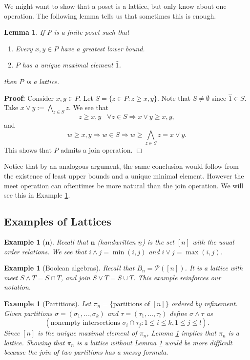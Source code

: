 \documentclass[11pt]{article}
\newtheorem{lemma}[theorem]{Lemma}
\newtheorem{example}[theorem]{Example}
\newenvironment{proof}{\noindent \textbf{Proof:}}{$\Box$}
\newcommand{\Bf}[1]{\textbf{#1}}
\newcommand{\wed}{\wedge}
\begin{document}
We might want to show that a poset is a lattice, but only know about one operation. The following lemma tells us that sometimes this is enough.
\begin{lemma} \label{meetlemma}
If $P$ is a finite poset such that
\begin{enumerate}
\item[(i)] Every $x,y \in P$ have a greatest lower bound.
\item[(ii)] $P$ has a unique maximal element $\hat{1}$.
\end{enumerate}
then $P$ is a lattice.
\end{lemma}
\begin{proof}
Consider $x,y \in P$. Let $S=\{z \in P: z \geq x, y \}$. Note that $S \neq \emptyset$ since $\hat{1} \in S$. Take $x \vee y:= \bigwedge_{z \in S} z$. We see that $$z \geq x,y \; \; \; \forall z \in S \Longrightarrow x \vee y \geq x,y,$$ and $$w \geq x,y \Longrightarrow w \in S \Longrightarrow w \geq \bigwedge_{z \in S}z=x \vee y.$$ This shows that $P$ admits a join operation.
\end{proof}

Notice that by an analogous argument, the same conclusion would follow from the existence of least upper bounds and a unique minimal element. However the meet operation can oftentimes be more natural than the join operation. We will see this in Example \ref{partition}.

\subsection*{Examples of Lattices}
\begin{example}[$\Bf{n}$]
Recall that $\Bf{n}$ (handwritten $\underline{n}$) is the set $[n]$ with the usual order relations. We see that $i \wed j =\operatorname{min}(i,j)$ and $i \vee j=\operatorname{max}(i,j)$.
\end{example}

\begin{example}[Boolean algebras]
Recall that $B_n=\mathcal{P}([n])$. It is a lattice with meet $S \wedge T=S \cap T$, and join $S \vee T=S \cup T$. This example reinforces our notation.
\end{example}

\begin{example}[Partitions] \label{partition}
Let $\pi_n=\{\text{partitions of } [n]\}$ ordered by refinement. Given partitions $\sigma=(\sigma_1,\ldots,\sigma_k)$ and $\tau=(\tau_1,\ldots,\tau_l)$ define $\sigma \wed \tau$ as $$(\text{nonempty intersections } \sigma_i \cap \tau_j : 1 \leq i \leq k, 1 \leq j \leq l).$$ Since $[n]$ is the unique maximal element of $\pi_n$, Lemma \ref{meetlemma} implies that $\pi_n$ is a lattice. Showing that $\pi_n$ is a lattice without Lemma \ref{meetlemma} would be more difficult because the join of two partitions has a messy formula.
\end{example}
\end{document}
